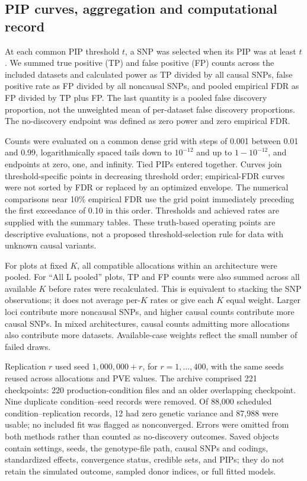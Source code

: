 \documentclass[12pt]{article}
\begin{document}
\subsection{PIP curves, aggregation and computational record}

At each common PIP threshold $t$, a SNP was selected when its PIP was
at least $t$. We summed true positive (TP) and false positive (FP)
counts across the included datasets and calculated power as TP divided
by all causal SNPs, false positive rate as FP divided by all noncausal
SNPs, and pooled empirical FDR as FP divided by TP plus FP. The last
quantity is a pooled false discovery proportion, not the unweighted
mean of per-dataset false discovery proportions. The no-discovery
endpoint was defined as zero power and zero empirical FDR.

Counts were evaluated on a common dense grid with steps of 0.001
between 0.01 and 0.99, logarithmically spaced tails down to $10^{-12}$
and up to $1-10^{-12}$, and endpoints at zero, one, and infinity.
Tied PIPs entered together. Curves join threshold-specific points in
decreasing threshold order; empirical-FDR curves were not sorted by
FDR or replaced by an optimized envelope. The numerical comparisons
near 10\% empirical FDR use the grid point immediately preceding the
first exceedance of 0.10 in this order. Thresholds and achieved rates
are supplied with the summary tables. These truth-based operating
points are descriptive evaluations, not a proposed threshold-selection
rule for data with unknown causal variants.

For plots at fixed $K$, all compatible allocations within an architecture
were pooled. For ``All L pooled'' plots, TP and FP counts were also
summed across all available $K$ before rates were recalculated. This is
equivalent to stacking the SNP observations; it does not average
per-$K$ rates or give each $K$ equal weight. Larger loci contribute
more noncausal SNPs, and higher causal counts contribute more causal
SNPs. In mixed architectures, causal counts admitting more allocations
also contribute more datasets. Available-case weights reflect the
small number of failed draws.

Replication $r$ used seed $1{,}000{,}000+r$, for $r=1,\ldots,400$,
with the same seeds reused across allocations and PVE values. The
archive comprised 221 checkpoints: 220 production-condition files and
an older overlapping checkpoint. Nine duplicate condition--seed records
were removed. Of 88,000 scheduled condition--replication records,
12 had zero genetic variance and 87,988 were usable; no included fit
was flagged as nonconverged. Errors were omitted from both methods
rather than counted as no-discovery outcomes. Saved objects contain
settings, seeds, the genotype-file path, causal SNPs and codings,
standardized effects, convergence status, credible sets, and PIPs;
they do not retain the simulated outcome, sampled donor indices, or
full fitted models.
\end{document}
